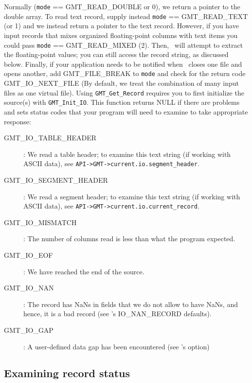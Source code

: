 \documentclass[11pt]{report}
\begin{document}
Normally (\texttt{mode} == GMT\_READ\_DOUBLE or 0), we return a pointer to the double array.
To read text record, supply instead \texttt{mode} == GMT\_READ\_TEXT (or 1) and we
instead return a pointer to the text record.
However, if you have input records that mixes organized floating-point columns with text
items you could pass \texttt{mode} == GMT\_READ\_MIXED (2).  Then, \GMT\ will attempt to extract the
floating-point values; you can still access the record string, as discussed below.
Finally, if your application needs to be notified when \GMT\ closes one file and opens another,
add GMT\_FILE\_BREAK to \texttt{mode} and check for the return code GMT\_IO\_NEXT\_FILE (By
default, we treat the combination of many input files as one virtual file).
Using \texttt{GMT\_Get\_Record} requires you to first initialize the source(s)
with \texttt{GMT\_Init\_IO}.  This function returns NULL if there are problems and sets status codes that your
program will need to examine to take appropriate response:
\begin{description}
\item [GMT\_IO\_TABLE\_HEADER]: We read a table header; to examine this text string
(if working with ASCII data), see \texttt{API->GMT->current.io.segment\_header}.
\item [GMT\_IO\_SEGMENT\_HEADER]: We read a segment header; to examine this text string
(if working with ASCII data), see \texttt{API->GMT->current.io.current\_record}.
\item [GMT\_IO\_MISMATCH]: The number of columns read is less than what the program expected.
\item [GMT\_IO\_EOF]: We have reached the end of the source.
\item [GMT\_IO\_NAN]: The record has NaNs in fields that we do not allow to have NaNs, and
hence, it is a bad record (see \GMT's IO\_NAN\_RECORD defaults). 
\item [GMT\_IO\_GAP]: A user-defined data gap has been encountered (see \GMT's  option)
\end{description}

\subsection{Examining record status}
\end{document}
